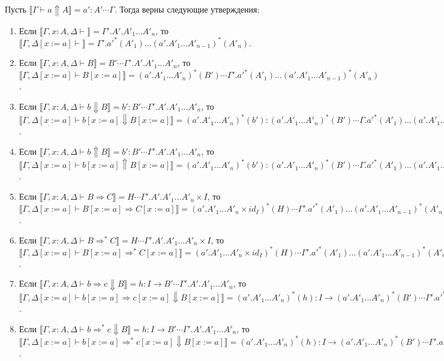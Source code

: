 \documentclass{amsart}
\theoremstyle{definition}
\theoremstyle{remark}
\newcommand{\red}{\Rightarrow}
\renewcommand{\ll}{\llbracket}
\newcommand{\rr}{\rrbracket}
\numberwithin{figure}{section}
\begin{document}
\begin{lem}
Пусть $\ll \Gamma \vdash a \Uparrow A \rr = a' : A' \dotsb \Gamma$.
Тогда верны следующие утверждения:
\begin{enumerate}
\item Если $\ll \Gamma, x : A, \Delta \vdash \rr = \Gamma'.A'.A'_1 \ldots A'_n$, то $\ll \Gamma, \Delta[x := a] \vdash \rr = \Gamma'.a'^*(A'_1) \ldots (a'.A'_1 \ldots A'_{n-1})^*(A'_n)$.
\item Если $\ll \Gamma, x : A, \Delta \vdash B \rr = B' \dotsb \Gamma'.A'.A'_1 \ldots A'_n$, то $\ll \Gamma, \Delta[x := a] \vdash B[x := a] \rr = (a'.A'_1 \ldots A'_n)^*(B') \dotsb \Gamma'.a'^*(A'_1) \ldots (a'.A'_1 \ldots A'_{n-1})^*(A'_n)$.
\item Если $\ll \Gamma, x : A, \Delta \vdash b \Downarrow B \rr = b' : B' \dotsb \Gamma'.A'.A'_1 \ldots A'_n$, то $\ll \Gamma, \Delta[x := a] \vdash b[x := a] \Downarrow B[x := a] \rr = (a'.A'_1 \ldots A'_n)^*(b') : (a'.A'_1 \ldots A'_n)^*(B') \dotsb \Gamma.a'^*(A'_1) \ldots (a'.A'_1 \ldots A'_{n-1})^*(A'_n)$.
\item Если $\ll \Gamma, x : A, \Delta \vdash b \Uparrow B \rr = b' : B' \dotsb \Gamma'.A'.A'_1 \ldots A'_n$, то $\ll \Gamma, \Delta[x := a] \vdash b[x := a] \Uparrow B[x := a] \rr = (a'.A'_1 \ldots A'_n)^*(b') : (a'.A'_1 \ldots A'_n)^*(B') \dotsb \Gamma.a'^*(A'_1) \ldots (a'.A'_1 \ldots A'_{n-1})^*(A'_n)$.
\item Если $\ll \Gamma, x : A, \Delta \vdash B \red C \rr = H \dotsb \Gamma'.A'.A'_1 \ldots A'_n \times I$, то $\ll \Gamma, \Delta[x := a] \vdash B[x := a] \red C[x := a] \rr = (a'.A'_1 \ldots A'_n \times id_I)^*(H) \dotsb \Gamma'.a'^*(A'_1) \ldots (a'.A'_1 \ldots A'_{n-1})^*(A'_n) \times I$.
\item Если $\ll \Gamma, x : A, \Delta \vdash B \red^* C \rr = H \dotsb \Gamma'.A'.A'_1 \ldots A'_n \times I$, то $\ll \Gamma, \Delta[x := a] \vdash B[x := a] \red^* C[x := a] \rr = (a'.A'_1 \ldots A'_n \times id_I)^*(H) \dotsb \Gamma'.a'^*(A'_1) \ldots (a'.A'_1 \ldots A'_{n-1})^*(A'_n) \times I$.
\item Если $\ll \Gamma, x : A, \Delta \vdash b \red c \Downarrow B \rr = h : I \to B' \dotsb \Gamma'.A'.A'_1 \ldots A'_n$, то $\ll \Gamma, \Delta[x := a] \vdash b[x := a] \red c[x := a] \Downarrow B[x := a] \rr = (a'.A'_1 \ldots A'_n)^*(h) : I \to (a'.A'_1 \ldots A'_n)^*(B') \dotsb \Gamma'.a'^*(A'_1) \ldots (a'.A'_1 \ldots A'_{n-1})^*(A'_n)$.
\item Если $\ll \Gamma, x : A, \Delta \vdash b \red^* c \Downarrow B \rr = h : I \to B' \dotsb \Gamma'.A'.A'_1 \ldots A'_n$, то $\ll \Gamma, \Delta[x := a] \vdash b[x := a] \red^* c[x := a] \Downarrow B[x := a] \rr = (a'.A'_1 \ldots A'_n)^*(h) : I \to (a'.A'_1 \ldots A'_n)^*(B') \dotsb \Gamma'.a'^*(A'_1) \ldots (a'.A'_1 \ldots A'_{n-1})^*(A'_n)$.
\end{enumerate}
\end{lem}
\end{document}
